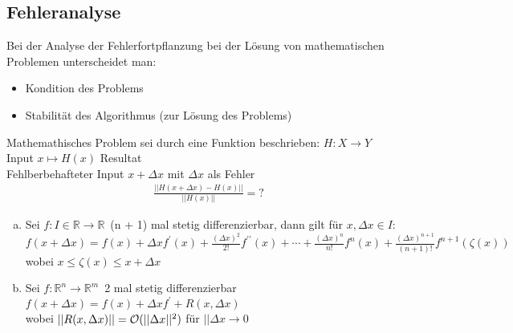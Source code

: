 \subsection{Fehleranalyse}
Bei der Analyse der Fehlerfortpflanzung bei der Lösung von mathematischen Problemen
unterscheidet man:
\begin{itemize}
  \item Kondition des Problems
  \item Stabilität des Algorithmus (zur Lösung des Problems)
\end{itemize}
Mathemathisches Problem sei durch eine Funktion beschrieben: $H:X \to Y$ \\ Input
$x \mapsto H(x)$ Resultat\\
Fehlberbehafteter Input $x + \Delta x$ mit $\Delta x$ als Fehler
\begin{align*}
  \frac{|| H(x + \Delta x) - H(x)||}{|| H(x) ||} = ?
\end{align*}
\begin{enumerate}[(a)]
  \item Sei $f: I \in \mathbb{R} \to \mathbb{R}\,$ (n + 1) mal stetig differenzierbar, dann gilt für
    $x, \Delta x \in I$: \\
    $f(x + \Delta x) = f(x) + \Delta x f^{\prime}(x) + 
    \frac{(\Delta x)^2}{2!}f^{\prime\prime}(x) + \cdots + 
    \frac{(\Delta x)^n}{n!}f^n(x)+
    \frac{(\Delta x)^{n + 1}}{(n + 1)!}f^{n + 1}(\zeta(x)) $ \\
    wobei $x \leq \zeta(x)\leq x + \Delta x$
  \item Sei $f: \mathbb{R}^n \to \mathbb{R}^m\,$ 2 mal stetig differenzierbar \\
    $f(x + \Delta x) = f(x) + \Delta x f^{\prime} + R(x, \Delta x) $ \\
    wobei $||R(x, \Delta x)|| = \mathcal{O}(||\Delta x||^2)$ für $||\Delta x \to 0$
\end{enumerate}
